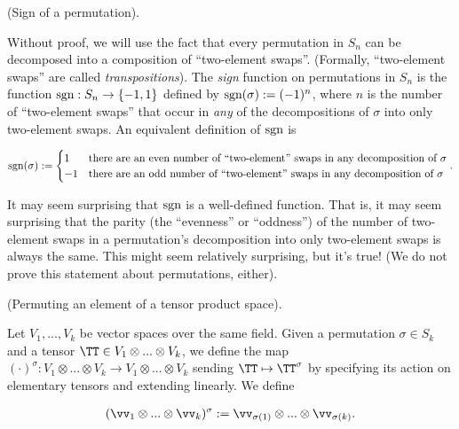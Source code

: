 \begin{remark}
    (Sign of a permutation).
    
    Without proof, we will use the fact that every permutation in $S_n$ can be decomposed into a composition of ``two-element swaps''. (Formally, ``two-element swaps'' are called \textit{transpositions}). The \textit{sign} function on permutations in $S_n$ is the function $\text{sgn}:S_n \rightarrow \{-1, 1\}$ defined by $\text{sgn}(\sigma) := (-1)^n$, where $n$ is the number of ``two-element swaps'' that occur in \textit{any} of the decompositions of $\sigma$ into only two-element swaps. An equivalent definition of $\text{sgn}$ is
    
    \begin{align*}
        \text{sgn}(\sigma) := 
        \begin{cases}
            1 & \text{there are an even number of ``two-element'' swaps in any decomposition of $\sigma$} \\
            -1 & \text{there are an odd number of ``two-element'' swaps in any decomposition of $\sigma$}
        \end{cases}.
    \end{align*}
    
    It may seem surprising that $\text{sgn}$ is a well-defined function. That is, it may seem surprising that the parity (the ``evenness'' or ``oddness'') of the number of two-element swaps in a permutation's decomposition into only two-element swaps is always the same. This might seem relatively surprising, but it's true! (We do not prove this statement about permutations, either).
\end{remark}

\begin{defn}
    (Permuting an element of a tensor product space).
    
    Let $V_1, ..., V_k$ be vector spaces over the same field. Given a permutation $\sigma \in S_k$ and a tensor $\TT \in V_1 \otimes ... \otimes V_k$, we define the map $(\cdot)^\sigma:V_1 \otimes ... \otimes V_k \rightarrow V_1 \otimes ... \otimes V_k$ sending $\TT \mapsto \TT^\sigma$ by specifying its action on elementary tensors and extending linearly. We define
    
    \begin{align*}
        (\vv_1 \otimes ... \otimes \vv_k)^\sigma := \vv_{\sigma(1)} \otimes ... \otimes \vv_{\sigma(k)}.
    \end{align*}
\end{defn}

